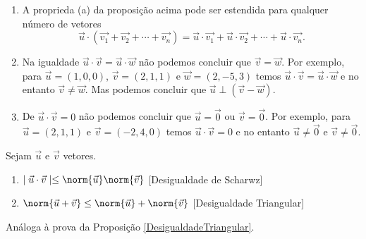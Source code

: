 \begin{observacao}
  \begin{enumerate}
    \item A proprieda (a) da proposi\c{c}\~ao acima pode ser estendida para qualquer n\'umero de vetores
    \[
      \vec{u}\cdot(\vec{v_1} + \vec{v_2} + \cdots + \vec{v_n} ) = \vec{u}\cdot\vec{v_1} + \vec{u}\cdot\vec{v_2} + \cdots + \vec{u}\cdot\vec{v_n}.
    \]
    \item Na igualdade $\vec{u}\cdot\vec{v} = \vec{u}\cdot\vec{w}$ n\~ao podemos concluir que $\vec{v} = \vec{w}$. Por exemplo, para $\vec{u} = (1, 0, 0)$, $\vec{v} = (2, 1, 1)$ e $\vec{w} = (2, -5, 3)$ temos $\vec{u}\cdot\vec{v} = \vec{u}\cdot\vec{w}$ e no entanto $\vec{v} \ne \vec{w}$. Mas podemos concluir que $\vec{u}\perp(\vec{v} - \vec{w})$.
    \item De $\vec{u}\cdot\vec{v} = 0$ n\~ao podemos concluir que $\vec{u} = \vec{0}$ ou $\vec{v} = \vec{0}$. Por exemplo, para $\vec{u} = (2, 1, 1)$ e $\vec{v} = (-2, 4, 0)$ temos $\vec{u}\cdot\vec{v} = 0$ e no entanto $\vec{u} \ne \vec{0}$ e $\vec{v} \ne \vec{0}$.
  \end{enumerate}
\end{observacao}

\begin{proposicao}Sejam $\vec{u}$ e $\vec{v}$ vetores.
  \begin{enumerate}
    \item $\mid\vec{u}\cdot\vec{v}\mid \le \norm{\vec{u}}\norm{\vec{v}}$ [Desigualdade de Scharwz]
    \item $\norm{\vec{u} + \vec{v}} \le \norm{\vec{u}} + \norm{\vec{v}}$ [Desigualdade Triangular]
  \end{enumerate}
\end{proposicao}
\begin{prova}
  An\'aloga \`a prova da Proposi\c{c}\~ao \ref{DesigualdadeTriangular}.
\end{prova}


